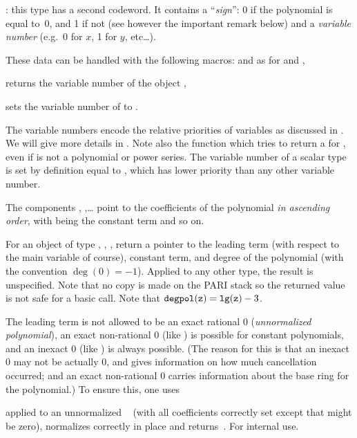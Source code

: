 : this
type has a second codeword. It contains a ``\emph{sign}'': 0 if the
polynomial is equal to~0, and 1 if not (see however the important remark
below) and a \emph{variable number} (e.g.~0 for $x$, 1 for $y$, etc\dots).

\noindent These data can be handled with the following macros: 
and  as for  and ,

 returns the variable number of the object ,

 sets the variable number of  to
.

The variable numbers encode the relative priorities of variables as discussed
in . We will give more details in . Note
also the function  which tries to return a
 for , even if  is not a polynomial or
power series. The variable number of a scalar type is set by definition equal
to , which has lower priority than any other variable number.

The components , ,\dots {} point to the
coefficients of the polynomial \emph{in ascending order}, with 
being the constant term and so on.

For an object of type , , ,
 return a pointer to the leading term (with respect to the main
variable of course), constant term, and degree of the polynomial (with the
convention $\deg(0) = -1$). Applied to any other type, the result is
unspecified. Note that no copy is made on the PARI stack so the returned
value is not safe for a basic  call. Note that ${\tt degpol(z)}
= {\tt lg(z)} - 3$.

The leading term is not allowed to be an exact rational $0$
(\emph{unnormalized polynomial}), an exact non-rational $0$ (like
) is possible for constant polynomials, and an inexact $0$
(like ) is always possible. (The reason for this is that
an inexact $0$ may not be actually $0$, and gives information on how much
cancellation occurred; and an exact non-rational $0$ carries information
about the base ring for the polynomial.) To ensure this, one uses

 applied to an unnormalized ~
(with all coefficients correctly set except that  might
be zero), normalizes  correctly in place and returns~. For
internal use.

